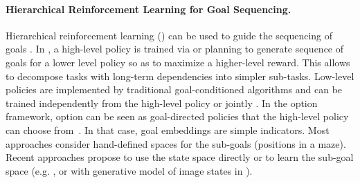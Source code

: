 \paragraph{Hierarchical Reinforcement Learning for Goal Sequencing.}

Hierarchical reinforcement learning (\hrl) can be used to guide the sequencing of goals \cite{dayan1993feudal,sutton1998intra,sutton_between_1999,precup2001temporal}. In \hrl, a high-level policy is trained via \rl or planning to generate sequence of goals for a lower level policy so as to maximize a higher-level reward. This allows to decompose tasks with long-term dependencies into simpler sub-tasks. Low-level policies are implemented by traditional goal-conditioned \rl algorithms \cite{levy2018hierarchical,roder2020curious} and can be trained independently from the high-level policy \cite{kulkarni2016hierarchical,frans2017meta} or jointly \cite{levy2018hierarchical,nachum2018data,roder2020curious}. In the option framework, option can be seen as goal-directed policies that the high-level policy can choose from~\cite{sutton_between_1999,precup_temporal_2000}. In that case, goal embeddings are simple indicators. Most approaches consider hand-defined spaces for the sub-goals (\eg positions in a maze). Recent approaches propose to use the state space directly \cite{nachum2018data} or to learn the sub-goal space (e.g. \cite{vezhnevets2017feudal}, or with generative model of image states in  \cite{nasiriany2019planning}). 






